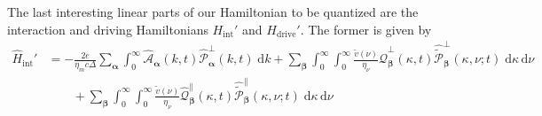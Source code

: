 \documentclass{article}
\begin{document}
The last interesting linear parts of our Hamiltonian to be quantized are the interaction and driving Hamiltonians $H_\mathrm{int}'$ and $H_\mathrm{drive}'$. The former is given by
\begin{equation}
\begin{split}
\hat{H}_\mathrm{int}' &= -\frac{2e}{\eta_mc\Delta}\sum_{\bm{\alpha}}\int_0^\infty\hat{\mathcal{A}}_{\bm{\alpha}}(k,t)\hat{\mathcal{P}}_{\bm{\alpha}}^\perp(k,t)\;\mathrm{d}k + \sum_{\bm{\beta}}\int_0^\infty\int_0^\infty\frac{\tilde{v}(\nu)}{\eta_\nu}\hat{\mathcal{Q}}_{\bm{\beta}}^\perp(\kappa,t)\hat{\tilde{\mathcal{P}}}_{\bm{\beta}}^\perp(\kappa,\nu;t)\;\mathrm{d}\kappa\,\mathrm{d}\nu\\
&\qquad + \sum_{\bm{\beta}}\int_0^\infty\int_0^\infty\frac{\tilde{v}(\nu)}{\eta_\nu}\hat{\mathcal{Q}}_{\bm{\beta}}^\parallel(\kappa,t)\hat{\tilde{\mathcal{P}}}_{\bm{\beta}}^\parallel(\kappa,\nu;t)\;\mathrm{d}\kappa\,\mathrm{d}\nu\\

\end{split}
\end{equation}
\end{document}
